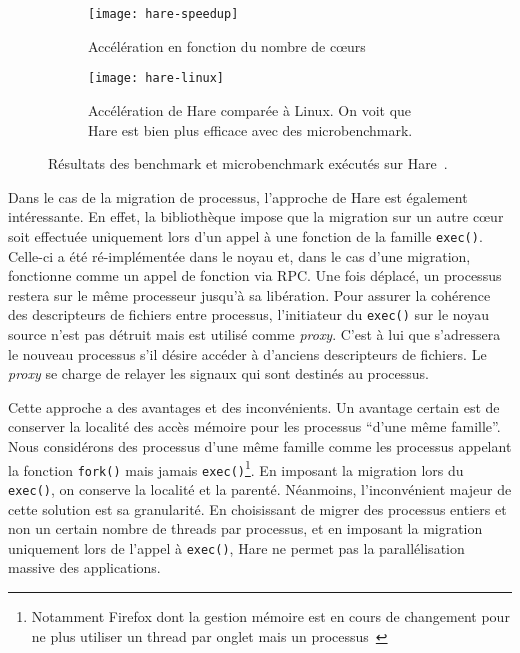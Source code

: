      \begin{figure}[ht]
        \begin{subfigure}[b]{0.5\textwidth}
          \texttt{[image: hare-speedup]}
          \caption{Accélération en fonction du nombre de c\oe urs}
        \end{subfigure}
        \begin{subfigure}[b]{0.5\textwidth}
          \texttt{[image: hare-linux]}
          \caption{Accélération de Hare comparée à Linux. On voit que Hare est
            bien plus efficace avec des microbenchmark.}
        \end{subfigure}
        \caption{Résultats des benchmark et microbenchmark exécutés sur
          Hare~\citep{gruenwald2014providing}.}
        \label{fig:hare-res}
      \end{figure}

      Dans le cas de la migration de processus, l'approche de Hare est également
      intéressante. En effet, la bibliothèque impose que la migration sur un
      autre c\oe ur soit effectuée uniquement lors d'un appel à une fonction de
      la famille \texttt{exec()}. Celle-ci a été ré-implémentée dans le noyau
      et, dans le cas d'une migration, fonctionne comme un appel de fonction via
      RPC. Une fois déplacé, un processus restera sur le même processeur jusqu'à
      sa libération. Pour assurer la cohérence des descripteurs de fichiers
      entre processus, l'initiateur du \texttt{exec()} sur le noyau source n'est
      pas détruit mais est utilisé comme \textit{proxy}. C'est à lui que
      s'adressera le nouveau processus s'il désire accéder à d'anciens
      descripteurs de fichiers. Le \textit{proxy} se charge de relayer les
      signaux qui sont destinés au processus.

      \enlargethispage{2mm} %

      Cette approche a des avantages et des inconvénients. Un avantage certain
      est de conserver la localité des accès mémoire pour les processus ``d'une
      même famille''. Nous considérons des processus d'une même famille comme
      les processus appelant la fonction \texttt{fork()} mais jamais
      \texttt{exec()}\footnote{Notamment Firefox dont la gestion mémoire est en
        cours de changement pour ne plus utiliser un thread par onglet mais un
        processus~\citep{mozillaElectrolysis}}. En imposant la migration lors du
      \texttt{exec()}, on conserve la localité et la parenté. Néanmoins,
      l'inconvénient majeur de cette solution est sa granularité. En choisissant
      de migrer des processus entiers et non un certain nombre de threads par
      processus, et en imposant la migration uniquement lors de l'appel à
      \texttt{exec()}, Hare ne permet pas la parallélisation massive des
      applications.


